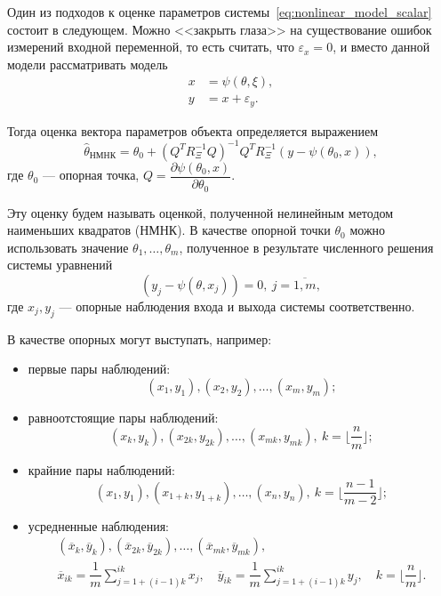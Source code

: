 Один из подходов к оценке параметров системы~\eqref{eq:nonlinear_model_scalar} состоит в следующем.
Можно <<закрыть глаза>> на существование ошибок измерений
входной переменной, то есть считать, что \( \varepsilon_x = 0 \),
и вместо данной модели рассматривать модель
\begin{equation}
  \label{eq:nonlinear_model_lse}
  \begin{aligned}
  x &= \psi(\theta, \xi), \\
  y &= x + \varepsilon_y.
  \end{aligned}
\end{equation}

Тогда оценка вектора параметров объекта определяется выражением~\cite{mukha_2009}
\begin{equation}
  \label{eq:nonlinear_lse}
  \hat{\theta}_{\text{НМНК}} =
  \theta_0 + (Q^T R^{-1}_{\Xi} Q)^{-1} Q^T R^{-1}_{\Xi} (y - \psi(\theta_0, x)),
\end{equation}
где \( \theta_0 \) --- опорная точка,
\( Q = \dfrac{\partial \psi(\theta_0, x) }{ \partial \theta_0 } \).

Эту оценку будем называть оценкой, полученной нелинейным
методом наименьших квадратов (НМНК).
В качестве опорной точки \( \theta_0 \) можно использовать значение
\( \theta_1, \dotsc, \theta_m \),
полученное в результате численного решения системы уравнений
\begin{equation}
  \label{eq:nonlinear_basic}
  (y_j - \psi( \theta, x_j )) = 0, \: j = \overline{1,m},
\end{equation}
где \( x_j, y_j \) --- опорные наблюдения входа и выхода системы соответственно.

В качестве опорных могут выступать, например:
\begin{itemize}
\item первые пары наблюдений:
  \[ (x_1, y_1), (x_2, y_2), \dotsc , (x_m, y_m); \]
\item равноотстоящие пары наблюдений:
  \[
    (x_{k}, y_{k}), (x_{2k}, y_{2k}) , \dotsc , (x_{mk}, y_{mk}), \:
    k = \lfloor \dfrac{n}{m} \rfloor;
  \]
\item крайние пары наблюдений:
  \[
    (x_{1}, y_{1}), (x_{1 + k}, y_{1 + k}) , \dotsc , (x_{n}, y_{n}), \:
    k = \lfloor \dfrac{n-1}{m-2} \rfloor;
  \]
\item усредненные наблюдения:
  \begin{gather*}
    ( \overline{x}_{k}, \overline{y}_{k} ),
    ( \overline{x}_{2k}, \overline{y}_{2k} ),
    \dotsc ,
    ( \overline{x}_{mk}, \overline{y}_{mk}), \\
    \overline{x}_{ik} = \dfrac{1}{m} \sum_{j = 1+(i-1)k}^{ik} x_j, \quad
    \overline{y}_{ik} = \dfrac{1}{m} \sum_{j = 1+(i-1)k}^{ik} y_j, \quad
    k = \lfloor \dfrac{n}{m} \rfloor.
  \end{gather*}
\end{itemize}

